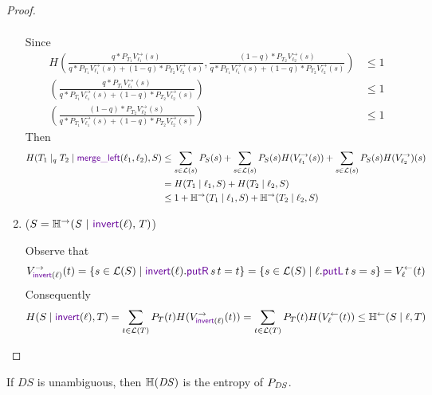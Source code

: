 \documentclass[acmsmall,screen,anonymous]{acmart}
\begin{document}
\begin{proof}
\begin{enumerate}
\begin{align*}
\end{align*}
Since
\begin{align*}
H \left(\frac{q * P_{T_1}V^{\rightarrow}_{\ell_1}(s)}{q * P_{T_1}V^{\rightarrow}_{\ell_1}(s) + (1-q) * P_{T_2}V^{\rightarrow}_{\ell_2}(s)}, \frac{(1-q) * P_{T_2}V^{\rightarrow}_{\ell_2}(s)}{q * P_{T_1}V^{\rightarrow}_{\ell_1}(s) + (1-q) * P_{T_2}V^{\rightarrow}_{\ell_2}(s)}\right) &\leq 1\\
\left(\frac{q * P_{T_1}V^{\rightarrow}_{\ell_1}(s)}{q * P_{T_1}V^{\rightarrow}_{\ell_1}(s) + (1-q) * P_{T_2}V^{\rightarrow}_{\ell_2}(s)}\right) &\leq 1\\
\left(\frac{(1-q) * P_{T_2}V^{\rightarrow}_{\ell_2}(s)}{q * P_{T_1}V^{\rightarrow}_{\ell_1}(s) + (1-q) * P_{T_2}V^{\rightarrow}_{\ell_2}(s)}\right) &\leq 1
\end{align*}
Then
\begin{align*}
H(T_1 \; |_q \; T_2 \; | \; \MergeLOf{\Lens_1}{\Lens_2}, S) & \leq \sum_{s \in \mathcal{L}(s)}P_S(s) + \sum_{s \in \mathcal{L}(s)}P_S(s)H(V^{\rightarrow}_{\ell_1}(s)) + \sum_{s \in \mathcal{L}(s)}P_S(s)H(V^{\rightarrow}_{\ell_2})(s)\\
&= H(T_1 \; | \; \ell_1, S) + H(T_2 \; | \; \ell_2, S)\\
&\leq 1 + \mathbb{H}^{\rightarrow}(T_1 \; | \; \ell_1, S) + \mathbb{H}^{\rightarrow}(T_2 \; | \; \ell_2, S)
\end{align*}
\item
($S = \REntropyOf{\Regex \Given \InvertOf{\Lens}, \RegexAlt}$)

Observe that $$V^{\rightarrow}_{\InvertOf{\Lens}}(t) = \{s \in \mathcal{L}(S) \; | \; \InvertOf{\Lens}.\PutROf{s}{t} = t\} = \{s \in \mathcal{L}(S) \; | \; \ell.\PutLOf{t}{s} = s\} = V^{\leftarrow}_{\ell}(t)$$
Consequently
$$
H(S \; | \; \InvertOf{\Lens}, T) = \sum_{t \in \mathcal{L}(T)}P_T(t) H(V^{\rightarrow}_{\InvertOf{\Lens}}(t))
= \sum_{t \in \mathcal{L}(T)}P_T(t) H(V^{\leftarrow}_{\ell}(t))
\leq \mathbb{H}^{\leftarrow}(S\; | \; \ell, T)
$$
\end{enumerate}

\end{proof}
\begin{theorem}
If $DS$ is unambiguous, then $\mathbb{H}(\mathit{DS})$ is the entropy of $P_{\mathit{DS}}$.
\end{theorem}
\end{document}
